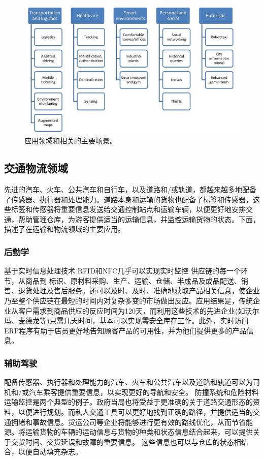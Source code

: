 \documentclass[12pt,a4paper]{article}%
\begin{document}
\begin{figure}[H]%
	\centering
	\begin{minipage}{0.9\textwidth}%
		\centering
		\includegraphics[width=1.0%
		\textwidth]{fig4.jpg}%
		\caption{\fontsize{10pt}{15pt}\selectfont 应用领域和相关的主要场景。}%
	\end{minipage}
\end{figure}

\subsection{交通物流领域}
先进的汽车、火车、公共汽车和自行车，以及道路和/或轨道，都越来越多地配备了传感器、执行器和处理能力。道路本身和运输的货物也配备了标签和传感器，这些标签和传感器将重要信息发送给交通控制站点和运输车辆，以便更好地安排交通，帮助管理仓库，为游客提供适当的运输信息，并监控运输货物的状态。下面，描述了在运输和物流领域的主要应用。
\subsubsection{后勤学}
基于实时信息处理技术
RFID和NFC几乎可以实现实时监控
供应链的每一个环节，从商品到
标识、原材料采购、生产、运输、仓储、半成品及成品配送、销售、退货处理及售后服务。还可以及时、及时、准确地获取产品相关信息，使企业乃至整个供应链在最短的时间内对复杂多变的市场做出反应。应用结果是，传统企业从客户需求到商品供应的反应时间为120天，而利用这些技术的先进企业(如沃尔玛、麦德龙等)只需几天时间，基本可以实现零安全库存工作。此外，实时访问ERP程序有助于店员更好地告知顾客产品的可用性，并为他们提供更多的产品信息。

\subsubsection{辅助驾驶}
配备传感器、执行器和处理能力的汽车、火车和公共汽车以及道路和轨道可以为司机和/或汽车乘客提供重要信息，以实现更好的导航和安全。
防撞系统和危险材料运输监控是两个典型的例子。政府当局也将受益于更准确的关于道路交通形态的资料，以便进行规划。而私人交通工具可以更好地找到正确的路径，并提供适当的交通拥堵和事故信息。货运公司等企业将能够进行更有效的路线优化，从而节省能源。将运输货物的车辆的运动信息与货物的种类和状态信息结合起来，可以提供关于交货时间、交货延误和故障的重要信息。
这些信息也可以与仓库的状态相结合，以便自动填充杂志。
\end{document}
